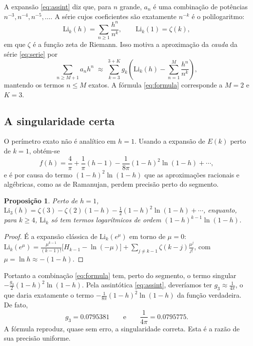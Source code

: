 \documentclass[11pt,a4paper]{article}
\newtheorem{proposicao}[teorema]{Proposição}
\theoremstyle{remark}
\begin{document}
A expansão \eqref{eq:assint} diz que, para $n$ grande, $a_n$ é uma combinação
de potências $n^{-3},n^{-4},n^{-5},\dots$. A série cujos coeficientes são
exatamente $n^{-k}$ é o polilogaritmo:
\begin{equation}
\mathrm{Li}_k(h)=\sum_{n\ge1}\frac{h^n}{n^k},\qquad \mathrm{Li}_k(1)=\zeta(k),
\end{equation}
em que $\zeta$ é a função zeta de Riemann. Isso motiva a aproximação da
\emph{cauda} da série \eqref{eq:serie} por
\begin{equation}
\sum_{n\ge M+1}a_nh^n\;\approx\;\sum_{k=3}^{3+K}g_k\left(\mathrm{Li}_k(h)-\sum_{n=1}^{M}\frac{h^n}{n^k}\right),
\end{equation}
mantendo os termos $n\le M$ exatos. A fórmula \eqref{eq:formula} corresponde a
$M=2$ e $K=3$.

\subsection{A singularidade certa}

O perímetro exato não é analítico em $h=1$. Usando a expansão de $E(k)$ perto
de $k=1$, obtém-se
\begin{equation}
f(h)=\frac4\pi+\frac{1}{\pi}(h-1)-\frac{1}{8\pi}(1-h)^2\ln(1-h)+\cdots,
\end{equation}
e é por causa do termo $(1-h)^2\ln(1-h)$ que as aproximações racionais e
algébricas, como as de Ramanujan, perdem precisão perto do segmento.

\begin{proposicao}\label{prop:sing}
Perto de $h=1$,
$\mathrm{Li}_3(h)=\zeta(3)-\zeta(2)(1-h)-\tfrac12(1-h)^2\ln(1-h)+\cdots$, enquanto, para $k\ge4$,
$\mathrm{Li}_k$ só tem termos logarítmicos de ordem $(1-h)^{k-1}\ln(1-h)$.
\end{proposicao}
\begin{proof}
É a expansão clássica de $\mathrm{Li}_k(e^\mu)$ em torno de $\mu=0$:
$\mathrm{Li}_k(e^\mu)=\frac{\mu^{k-1}}{(k-1)!}\big[H_{k-1}-\ln(-\mu)\big]
+\sum_{j\ne k-1}\zeta(k-j)\frac{\mu^j}{j!}$, com $\mu=\ln h\approx-(1-h)$.
\end{proof}

Portanto a combinação \eqref{eq:formula} tem, perto do segmento, o termo
singular $-\frac{g_3}{2}(1-h)^2\ln(1-h)$. Pela assintótica \eqref{eq:assint},
deveríamos ter $g_3\approx\frac{1}{4\pi}$, o que daria exatamente o termo
$-\frac{1}{8\pi}(1-h)^2\ln(1-h)$ da função verdadeira. De fato,
\[
g_3=0.0795381\qquad\text{e}\qquad\frac1{4\pi}=0.0795775.
\]
A fórmula reproduz, quase sem erro, a singularidade correta. Esta é a razão de
sua precisão uniforme.
\end{document}

